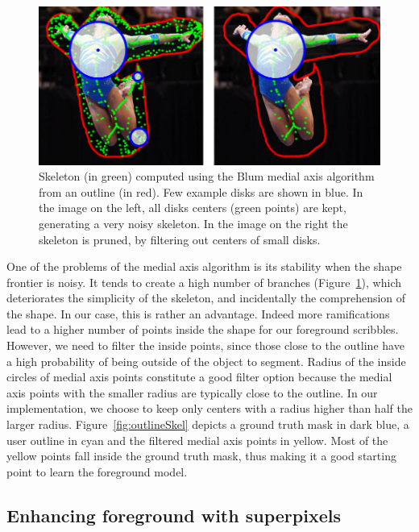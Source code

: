 \begin{figure}[ht]
\includegraphics[width=\columnwidth]{assets/img/skeleton.jpg}
\caption{Skeleton (in green) computed using the Blum medial
axis algorithm from an outline (in red).
Few example disks are shown in blue.
In the image on the left, all disks centers (green points) are kept,
generating a very noisy skeleton.
In the image on the right the skeleton is pruned,
by filtering out centers of small disks.}%
\label{fig:skeleton}
\end{figure}


One of the problems of the medial axis algorithm is its stability
when the shape frontier is noisy.
It tends to create a high number of branches
(Figure~\ref{fig:skeleton}),
which deteriorates the simplicity of the skeleton,
and incidentally the comprehension of the shape.
In our case, this is rather an advantage.
Indeed more ramifications lead to a higher number of points
inside the shape for our foreground scribbles.
However, we need to filter the inside points,
since those close to the outline have a high probability
of being outside of the object to segment.
Radius of the inside circles of medial axis points
constitute a good filter option
because the medial axis points with the smaller radius are typically
close to the outline.
In our implementation, we choose to keep only centers
with a radius higher than half the larger radius.
Figure~\ref{fig:outlineSkel} depicts a ground truth mask in dark blue,
a user outline in cyan and the filtered medial axis points in yellow.
Most of the yellow points fall inside the ground truth mask,
thus making it a good starting point to learn the foreground model.


\subsection{Enhancing foreground with superpixels}%
\label{sec:superpixels}



